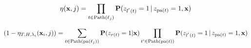 \documentclass{article}
\newcommand{\R}{\mathbb{R}}
\newcommand{\cH}{\mathcal{H}}
\newcommand{\cL}{\mathcal{L}}
\newcommand{\path}{\text{Path}}
\newcommand{\Path}[1]{\mathrm{Path}(#1)}
\newcommand{\pa}[1]{\mathrm{pa}(#1)}
\newcommand{\leaves}{d}
\renewcommand{\vec}[1]{\mathbf{#1}}
\newcommand{\bx}{\mathbf{x}}
\newcommand{\by}{\vec{y}}
\newcommand{\prob}{\mathbf{P}}
\newcommand{\given}{\, | \,}
\newcommand{\Algo}[1]{\textsc{#1}}
\begin{document}
\begin{equation}
\eta(\bx, j) = \prod_{t \in \Path{\ell_j}} \prob(z_{l^{'}(t)} = 1 \given z_{\pa{t}} =1, \bx)\notag 
\end{equation}


\[
(1-\eta_{T,H,\lambda_i} ( \bx_i , j )) = \sum_{t \in \Path{\pa{\ell_j}}}   \prob(z_{r(t)} = 1 | \bx)  \prod_{t' \in \Path{\pa{t}}} \prob(z_{l^{'}(t)} = 1 \given z_{\pa{t}} =1, \bx)  \notag
\]






\end{document}

